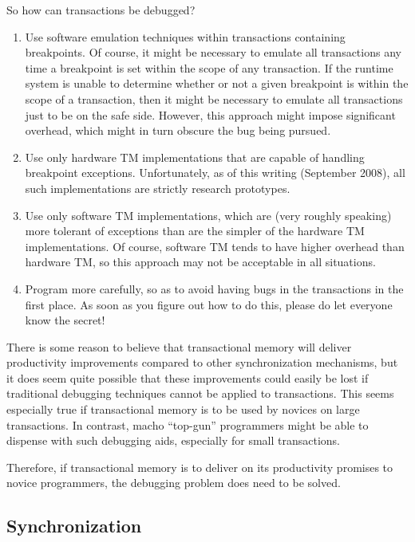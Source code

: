 So how can transactions be debugged?

\begin{enumerate}
\item	Use software emulation techniques within transactions containing
	breakpoints.
	Of course, it might be necessary to emulate all transactions
	any time a breakpoint is set within the scope of any transaction.
	If the runtime system is unable to determine whether or not a
	given breakpoint is within the scope of a transaction, then it
	might be necessary to emulate all transactions just to be on
	the safe side.
	However, this approach might impose significant overhead, which
	might in turn obscure the bug being pursued.
\item	Use only hardware TM implementations that are capable of
	handling breakpoint exceptions.
	Unfortunately, as of this writing (September 2008), all such
	implementations are strictly research prototypes.
\item	Use only software TM implementations, which are
	(very roughly speaking) more tolerant of exceptions than are
	the simpler of the hardware TM implementations.
	Of course, software TM tends to have higher overhead than hardware
	TM, so this approach may not be acceptable in all situations.
\item	Program more carefully, so as to avoid having bugs in the
	transactions in the first place.
	As soon as you figure out how to do this, please do let everyone
	know the secret!
\end{enumerate}

There is some reason to believe that transactional memory will deliver
productivity improvements compared to other synchronization mechanisms,
but it does seem quite possible that these improvements could easily
be lost if traditional debugging techniques cannot be applied to
transactions.
This seems especially true if transactional memory is to be used by
novices on large transactions.
In contrast, macho ``top-gun'' programmers might be able to dispense with
such debugging aids, especially for small transactions.

Therefore, if transactional memory is to deliver on its productivity
promises to novice programmers, the debugging problem does need to
be solved.

\subsection{Synchronization}
\label{sec:future:Synchronization}

